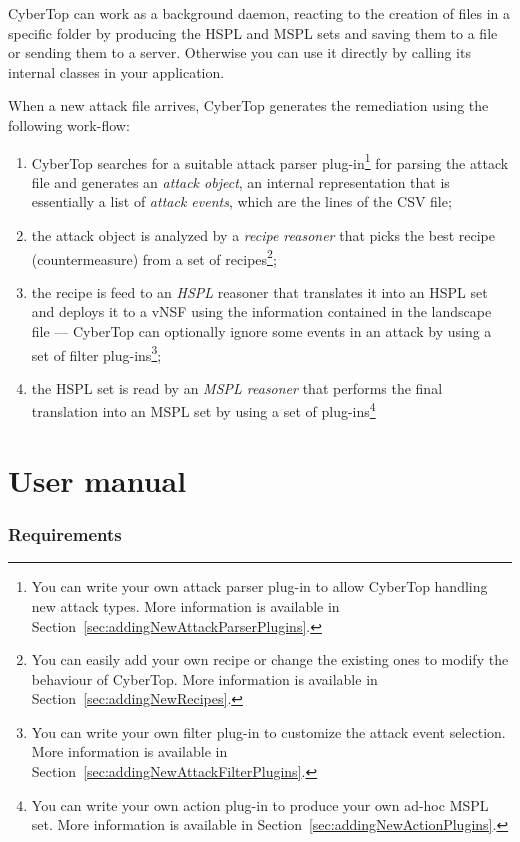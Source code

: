 \documentclass{scrartcl}
\begin{document}
CyberTop can work as a background daemon, reacting to the creation of files in a specific folder by producing the HSPL and MSPL sets and saving them to a file or sending them to a server. Otherwise you can use it directly by calling its internal classes in your application.

When a new attack file arrives, CyberTop generates the remediation using the following work-flow:

\begin{enumerate}
	\item CyberTop searches for a suitable attack parser plug-in\footnote{You can write your own attack parser plug-in to allow CyberTop handling new attack types. More information is available in Section~\ref{sec:addingNewAttackParserPlugins}.} for parsing the attack file and generates an \emph{attack object}, an internal representation that is essentially a list of \emph{attack events}, which are the lines of the CSV file;
	\item the attack object is analyzed by a \emph{recipe reasoner} that picks the best recipe (countermeasure) from a set of recipes\footnote{You can easily add your own recipe or change the existing ones to modify the behaviour of CyberTop. More information is available in Section~\ref{sec:addingNewRecipes}.};
	\item the recipe is feed to an \emph{HSPL} reasoner that translates it into an HSPL set and deploys it to a vNSF using the information contained in the landscape file --- CyberTop can optionally ignore some events in an attack by using a set of filter plug-ins\footnote{You can write your own filter plug-in to customize the attack event selection. More information is available in Section~\ref{sec:addingNewAttackFilterPlugins}.};
	\item the HSPL set is read by an \emph{MSPL reasoner} that performs the final translation into an MSPL set by using a set of plug-ins\footnote{You can write your own action plug-in to produce your own ad-hoc MSPL set. More information is available in Section~\ref{sec:addingNewActionPlugins}.}
\end{enumerate}

\cleardoublepage
\part{User manual}

\section{Requirements}
\end{document}
